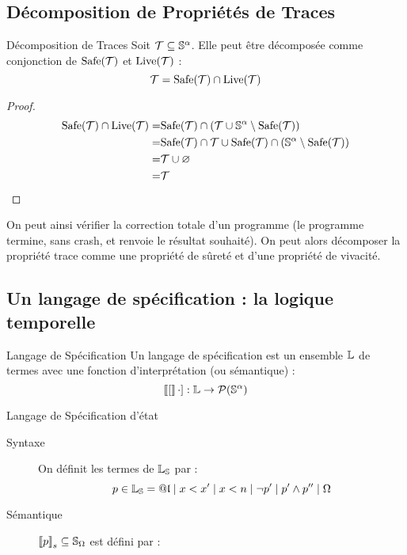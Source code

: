 \documentclass{cours}
\begin{document}
\subsection{Décomposition de Propriétés de Traces}
\begin{théorème}{Décomposition de Traces}{}
    Soit $\mathcal{T} \subseteq \mathbb{S}^{\alpha}$. Elle peut être décomposée comme conjonction de $\rm Safe(\mathcal{T})$ et $\rm Live(\mathcal{T})$ : 
    \[
        \mathcal{T} = \rm Safe(\mathcal{T}) \cap Live(\mathcal{T})
    \]
\end{théorème}
\begin{proof}
    \[
        \begin{aligned}
            \rm Safe(\mathcal{T}) \cap Live(\mathcal{T}) =& \rm Safe(\mathcal{T}) \cap \left(\mathcal{T} \cup \mathbb{S}^{\alpha} \setminus Safe(\mathcal{T})\right)\\
            =& \rm Safe(\mathcal{T}) \cap \mathcal{T} \cup Safe(\mathcal{T}) \cap \left(\mathbb{S}^{\alpha} \setminus Safe(\mathcal{T})\right)\\
            =& \mathcal{T} \cup \varnothing\\
            =& \mathcal{T}
        \end{aligned}
    \]
\end{proof}

On peut ainsi vérifier la correction totale d'un programme (le programme termine, sans crash, et renvoie le résultat souhaité). On peut alors décomposer la propriété trace comme une propriété de sûreté et d'une propriété de vivacité.

\subsection{Un langage de spécification : la logique temporelle}
\begin{définition}{Langage de Spécification}{}
    Un langage de spécification est un ensemble $\mathbb{L}$ de termes avec une fonction d'interprétation (ou sémantique) : 
    \[
        \left\llbracket [ \right\rrbracket\cdot] : \mathbb{L} \to \mathcal{P}(\mathbb{S}^{\alpha})
    \]
\end{définition}

\begin{propositionfr}{Langage de Spécification d'état}{}
    \begin{description}
        \item[Syntaxe] On définit les termes de $\mathbb{L}_{\mathbb{S}}$ par : 
        \[
            p \in \mathbb{L}_{\mathbb{S}} = \mathfrak{@l} \mid x < x' \mid x < n\mid \lnot p' \mid p' \land p'' \mid \Omega
        \]
        \item[Sémantique] $\left\llbracket p \right\rrbracket_{s} \subseteq \mathbb{S}_{\Omega}$ est défini par : 
    \end{description}
\end{propositionfr}
\end{document}
